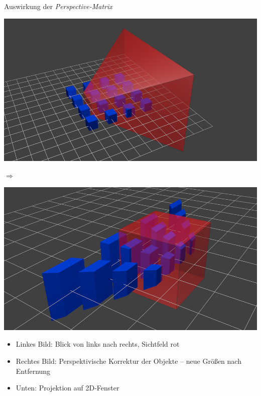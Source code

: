 \begin{frame}{Auswirkung der \emph{Perspective-Matrix}}
%
\begin{minipage}[l]{.46\linewidth}
\includegraphics[width=\linewidth]{./gfx/nondeforme} 
\end{minipage}
%
\begin{minipage}[c]{.06\linewidth}
\begin{center}
$\Rightarrow$
\end{center}
\end{minipage}
%
\begin{minipage}[r]{.46\linewidth}
\includegraphics[width=\linewidth]{./gfx/homogeneous}
\end{minipage}
%
\begin{minipage}{.79\linewidth}
\begin{itemize}
\item Linkes Bild: Blick von links nach rechts, Sichtfeld rot
\item Rechtes Bild: Perspektivische Korrektur der Objekte -- neue Größen nach Entfernung
\item Unten: Projektion auf 2D-Fenster

\end{itemize}
\end{minipage}
\end{frame}
